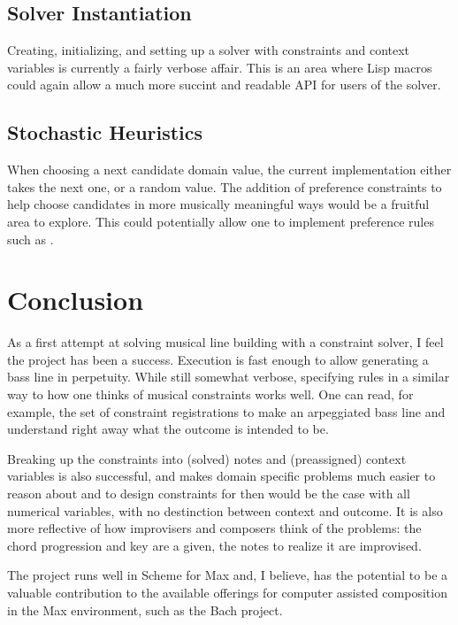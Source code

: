 \documentclass[letterpaper,10pt,english]{sphinxmanual}
\begin{document}
\section{Solver Instantiation}
\label{\detokenize{index:solver-instantiation}}
\sphinxAtStartPar
Creating, initializing, and setting up a solver with constraints and context variables
is currently a fairly verbose affair. This is an area where Lisp macros could
again allow a much more succint and readable API for users of the solver.


\section{Stochastic Heuristics}
\label{\detokenize{index:stochastic-heuristics}}
\sphinxAtStartPar
When choosing a next candidate domain value, the current implementation either
takes the next one, or a random value. The addition of preference constraints
to help choose candidates in more musically meaningful ways would be a fruitful
area to explore. This could potentially allow one to implement preference rules
such as .


\chapter{Conclusion}
\label{\detokenize{index:conclusion}}
\sphinxAtStartPar
As a first attempt at solving musical line building with a constraint solver,
I feel the project has been a success. Execution is fast enough to allow
generating a bass line in perpetuity. While still somewhat verbose, specifying
rules in a similar way to how one thinks of musical constraints works well.
One can read, for example, the set of constraint registrations to make an
arpeggiated bass line and understand right away what the outcome is intended to be.

\sphinxAtStartPar
Breaking up the constraints into (solved) notes and (pre\sphinxhyphen{}assigned) context variables is
also successful, and makes domain specific problems much easier to reason about and
to design constraints for then would be the case with all numerical variables, with
no destinction between context and outcome. It is also more reflective of
how improvisers and composers think of the problems: the chord progression and key
are a given, the notes to realize it are improvised.

\sphinxAtStartPar
The project runs well in Scheme for Max and, I believe, has the potential to be
a valuable contribution to the available offerings for computer assisted composition
in the Max environment, such as the Bach project.



\renewcommand{\indexname}{Index}
\printindex
\end{document}
